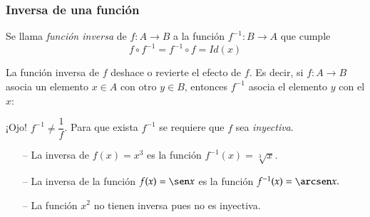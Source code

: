 \begin{frame}
\frametitle{Inversa de una función}
\begin{definicion}
Se llama \emph{función inversa} de $f:A\rightarrow B$ a la función $f^{-1}:B\rightarrow A$ que cumple
\[
f\circ f^{-1}=f^{-1}\circ f=Id(x)
\]
\end{definicion}

La función inversa de $f$ deshace o revierte el efecto de $f$. 
Es decir, si $f:A\rightarrow B$ asocia un elemento $x\in A$ con otro $y\in B$,
entonces $f^{-1}$ asocia el elemento $y$ con el $x$: 
\begin{center}
\scalebox{1}{}
\end{center}

\alert{¡Ojo! } $f^{-1}\neq \dfrac{1}{f}$. Para que exista $f^{-1}$ se requiere
que $f$ sea \emph{inyectiva}.

\begin{itemize}
\item[--] La inversa de $f(x)=x^3$ es la función $f^{-1}(x)=\sqrt[3]{x}.$ 
\item[--] La inversa de la función $f(x)=\sen x$ es la función
$f^{-1}(x)=\arcsen x.$
\item[--] La función $x^2$ no tienen inversa pues no es inyectiva.
\end{itemize}
\end{frame} 



